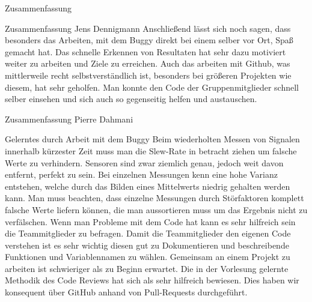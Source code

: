 \documentclass[12pt]{report}
\begin{document}
\begin{section}{Zusammenfassung}
\begin{subsection}{Zusammenfassung Jens Dennigmann}
      Anschließend lässt sich noch sagen, dass besonders das Arbeiten, mit dem Buggy direkt bei 
      einem selber vor Ort, Spaß gemacht hat. Das schnelle Erkennen von Resultaten hat sehr dazu 
      motiviert weiter zu arbeiten und Ziele zu erreichen. Auch das arbeiten mit Github, was 
      mittlerweile recht selbstverständlich ist, besonders bei größeren Projekten wie diesem, hat 
      sehr geholfen. Man konnte den Code der Gruppenmitglieder schnell selber einsehen und sich 
      auch so gegenseitig helfen und austauschen.
  \end{subsection}
        \begin{subsection}{Zusammenfassung Pierre Dahmani}
            \begin{paragraphwithnewline}{Gelerntes durch Arbeit mit dem Buggy}
            Beim wiederholten Messen von Signalen innerhalb kürzester Zeit muss
            man die Slew-Rate in betracht ziehen um falsche Werte zu verhindern.
            Sensoren sind zwar ziemlich genau, jedoch weit davon entfernt, perfekt
            zu sein. Bei einzelnen Messungen kenn eine hohe Varianz entstehen, welche
            durch das Bilden eines Mittelwerts niedrig gehalten werden kann. Man muss
            beachten, dass einzelne Messungen durch Störfaktoren komplett falsche Werte
            liefern können, die man aussortieren muss um das Ergebnis nicht zu 
            verfälschen. Wenn man Probleme mit dem Code hat kann es sehr hilfreich
            sein die Teammitglieder zu befragen. Damit die Teammitglieder den eigenen
            Code verstehen ist es sehr wichtig diesen gut zu Dokumentieren und
            beschreibende Funktionen und Variablennamen zu wählen. Gemeinsam an
            einem Projekt zu arbeiten ist schwieriger als zu Beginn erwartet. Die in
            der Vorlesung gelernte Methodik des Code Reviews hat sich als sehr hilfreich
            bewiesen. Dies haben wir konsequent über GitHub anhand von Pull-Requests
            durchgeführt.
            \end{paragraphwithnewline}


\end{subsection}
\end{section}
\end{document}
